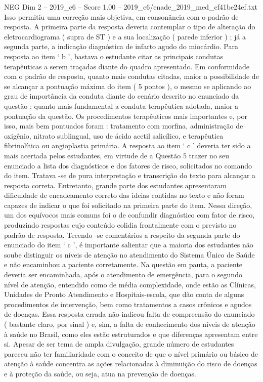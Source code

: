\begin{textsample}{NEG Dim 2 – 2019\_c6 – Score 1.00 – 2019\_c6/enade\_2019\_med\_cf41be24ef.txt}
Isso permitiu uma correção mais objetiva, em consonância com o padrão de resposta.
A primeira parte da resposta deveria contemplar o tipo de alteração do eletrocardiograma ( supra de ST ) e a sua localização ( parede inferior ) ; já a segunda parte, a indicação diagnóstica de infarto agudo do miocárdio.
Para resposta ao item ‘ b ’, bastava o estudante citar as principais condutas terapêuticas a serem traçadas diante do quadro apresentado.
Em conformidade com o padrão de resposta, quanto mais condutas citadas, maior a possibilidade de se alcançar a pontuação máxima do item ( 5 pontos ), o mesmo se aplicando ao grau de importância da conduta diante do cenário descrito no enunciado da questão : quanto mais fundamental a conduta terapêutica adotada, maior a pontuação da questão.
Os procedimentos terapêuticos mais importantes e, por isso, mais bem pontuados foram : tratamento com morfina, administração de oxigênio, nitrato sublingual, uso de ácido acetil salicílico, e terapêutica fibrinolítica ou angioplastia primária.
A resposta ao item ‘ c ’ deveria ter sido a mais acertada pelos estudantes, em virtude de a Questão 5 trazer no seu enunciado a lista dos diagnósticos e dos fatores de risco, solicitados no comando do item.
Tratava -se de pura interpretação e transcrição do texto para alcançar a resposta correta.
Entretanto, grande parte dos estudantes apresentaram dificuldade de encadeamento correto das ideias contidas no texto e não foram capazes de indicar o que foi solicitado na primeira parte do item.
Nessa direção, um dos equívocos mais comuns foi o de confundir diagnóstico com fator de risco, produzindo respostas cujo conteúdo colidia frontalmente com o previsto no padrão de resposta.
Tecendo -se comentários a respeito da segunda parte do enunciado do item ‘ c ’, é importante salientar que a maioria dos estudantes não soube distinguir os níveis de atenção no atendimento do Sistema Único de Saúde e não encaminhou a paciente corretamente.
Na questão em pauta, a paciente deveria ser encaminhada, após o atendimento de emergência, para o segundo nível de atenção, entendido como de média complexidade, onde estão as Clínicas, Unidades de Pronto Atendimento e Hospitais-escola, que dão conta de alguns procedimentos de intervenção, bem como tratamentos a casos crônicos e agudos de doenças.
Essa resposta errada não indicou falta de compreensão do enunciado ( bastante claro, por sinal ) e, sim, a falta de conhecimento dos níveis de atenção à saúde no Brasil, como eles estão estruturados e que diferenças apresentam entre si.
Apesar de ser tema de ampla divulgação, grande número de estudantes pareceu não ter familiaridade com o conceito de que o nível primário ou básico de atenção à saúde concentra as ações relacionadas à diminuição do risco de doenças e à proteção da saúde, ou seja, atua na prevenção de doenças.

\end{textsample}
